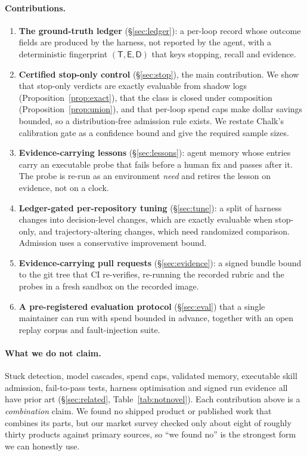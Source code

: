 \documentclass[11pt]{article}
\theoremstyle{remark}
\newcommand{\Tset}{\mathsf{T}}
\newcommand{\Eerr}{\mathsf{E}}
\newcommand{\Dtree}{\mathsf{D}}
\begin{document}
\paragraph{Contributions.}
\begin{enumerate}[leftmargin=*,label=\textbf{C\arabic*}.]
\item \textbf{The ground-truth ledger} (\S\ref{sec:ledger}): a per-loop record whose outcome fields are produced by the harness, not reported by the agent, with a deterministic fingerprint $(\Tset,\Eerr,\Dtree)$ that keys stopping, recall and evidence.
\item \textbf{Certified stop-only control} (\S\ref{sec:stop}), the main contribution. We show that stop-only verdicts are exactly evaluable from shadow logs (Proposition~\ref{prop:exact}), that the class is closed under composition (Proposition~\ref{prop:union}), and that per-loop spend caps make dollar savings bounded, so a distribution-free admission rule exists. We restate Chalk's calibration gate as a confidence bound and give the required sample sizes.
\item \textbf{Evidence-carrying lessons} (\S\ref{sec:lessons}): agent memory whose entries carry an executable probe that fails before a human fix and passes after it. The probe is re-run as an environment \emph{need} and retires the lesson on evidence, not on a clock.
\item \textbf{Ledger-gated per-repository tuning} (\S\ref{sec:tune}): a split of harness changes into decision-level changes, which are exactly evaluable when stop-only, and trajectory-altering changes, which need randomized comparison. Admission uses a conservative improvement bound.
\item \textbf{Evidence-carrying pull requests} (\S\ref{sec:evidence}): a signed bundle bound to the git tree that CI re-verifies, re-running the recorded rubric and the probes in a fresh sandbox on the recorded image.
\item \textbf{A pre-registered evaluation protocol} (\S\ref{sec:eval}) that a single maintainer can run with spend bounded in advance, together with an open replay corpus and fault-injection suite.
\end{enumerate}

\paragraph{What we do not claim.}
Stuck detection, model cascades, spend caps, validated memory, executable skill admission, fail-to-pass tests, harness optimisation and signed run evidence all have prior art (\S\ref{sec:related}, Table~\ref{tab:notnovel}). Each contribution above is a \emph{combination} claim. We found no shipped product or published work that combines its parts, but our market survey checked only about eight of roughly thirty products against primary sources, so ``we found no'' is the strongest form we can honestly use.
\end{document}
